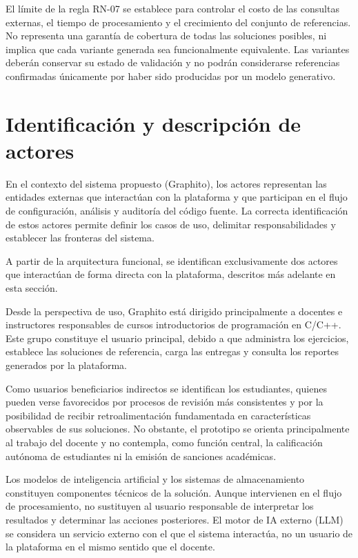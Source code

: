 El límite de la regla RN-07 se establece para controlar el costo de las consultas externas, el tiempo de procesamiento y el crecimiento del conjunto de referencias. No representa una garantía de cobertura de todas las soluciones posibles, ni implica que cada variante generada sea funcionalmente equivalente. Las variantes deberán conservar su estado de validación y no podrán considerarse referencias confirmadas únicamente por haber sido producidas por un modelo generativo.

\section{Identificación y descripción de actores}

En el contexto del sistema propuesto (Graphito), los actores representan las entidades externas que interactúan con la plataforma y que participan en el flujo de configuración, análisis y auditoría del código fuente. La correcta identificación de estos actores permite definir los casos de uso, delimitar responsabilidades y establecer las fronteras del sistema.

A partir de la arquitectura funcional, se identifican exclusivamente dos actores que interactúan de forma directa con la plataforma, descritos más adelante en esta sección.

Desde la perspectiva de uso, Graphito está dirigido principalmente a docentes e instructores responsables de cursos introductorios de programación en C/C++. Este grupo constituye el usuario principal, debido a que administra los ejercicios, establece las soluciones de referencia, carga las entregas y consulta los reportes generados por la plataforma.

Como usuarios beneficiarios indirectos se identifican los estudiantes, quienes pueden verse favorecidos por procesos de revisión más consistentes y por la posibilidad de recibir retroalimentación fundamentada en características observables de sus soluciones. No obstante, el prototipo se orienta principalmente al trabajo del docente y no contempla, como función central, la calificación autónoma de estudiantes ni la emisión de sanciones académicas.

Los modelos de inteligencia artificial y los sistemas de almacenamiento constituyen componentes técnicos de la solución. Aunque intervienen en el flujo de procesamiento, no sustituyen al usuario responsable de interpretar los resultados y determinar las acciones posteriores. El motor de IA externo (LLM) se considera un servicio externo con el que el sistema interactúa, no un usuario de la plataforma en el mismo sentido que el docente.

